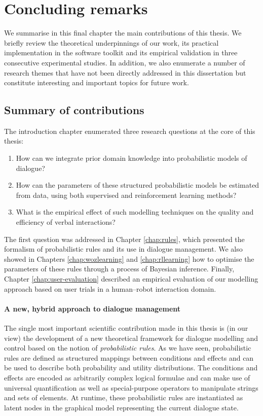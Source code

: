 \chapter{Concluding remarks}
\label{chap:conclusions}

We summarise in this final chapter the main contributions of this thesis.  We briefly review the theoretical underpinnings of our work, its practical implementation in the \opendial{} software toolkit and its empirical validation in three consecutive experimental studies.  In addition, we also enumerate a number of research themes that have not been directly addressed in this dissertation but constitute interesting and important topics for future work. 

\section{Summary of contributions}

The introduction chapter enumerated three research questions at the core of this thesis:
\begin{enumerate}
\item How can we integrate prior domain knowledge into probabilistic models of dialogue?
\item How can the parameters of these structured probabilistic models be estimated from data, using both supervised and reinforcement learning methods?  
\item What is the empirical effect of such modelling techniques on the quality and efficiency of verbal interactions?
\end{enumerate}

The first question was addressed in Chapter \ref{chap:rules}, which presented the formalism of probabilistic rules and its use in dialogue management.  We also showed in Chapters \ref{chap:wozlearning} and \ref{chap:rllearning} how to optimise the parameters of these rules through a process of Bayesian inference.  Finally, Chapter \ref{chap:user-evaluation} described an empirical evaluation of our modelling approach based on user trials in a human--robot interaction domain.

\subsubsection*{A new, hybrid approach to dialogue management}

The single most important scientific contribution made in this thesis is (in our view) the development of a new theoretical framework for dialogue modelling and control based on the notion of \textit{probabilistic rules}.  As we have seen, probabilistic rules are defined as structured mappings between conditions and effects and can be used to describe both probability and utility distributions.  The conditions and effects are encoded as arbitrarily complex logical formulae and can make use of universal quantification as well as special-purpose operators to manipulate strings and sets of elements. At runtime, these probabilistic rules are instantiated as latent nodes in the graphical model representing the current dialogue state.  


